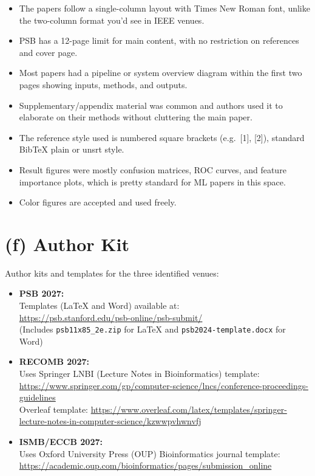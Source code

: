 \documentclass[12pt,a4paper]{article}
\begin{document}
\begin{itemize}
    \item The papers follow a single-column layout with Times New Roman font, unlike the two-column format you'd see in IEEE venues.
    \item PSB has a 12-page limit for main content, with no restriction on references and cover page.
    \item Most papers had a pipeline or system overview diagram within the first two pages showing inputs, methods, and outputs.
    \item Supplementary/appendix material was common and authors used it to elaborate on their methods without cluttering the main paper.
    \item The reference style used is numbered square brackets (e.g.\ [1], [2]), standard BibTeX plain or unsrt style.
    \item Result figures were mostly confusion matrices, ROC curves, and feature importance plots, which is pretty standard for ML papers in this space.
    \item Color figures are accepted and used freely.
\end{itemize}

\newpage

\section*{(f) Author Kit}

Author kits and templates for the three identified venues:

\begin{itemize}

    \item \textbf{PSB 2027:}\\
    Templates (LaTeX and Word) available at:\\
    \url{https://psb.stanford.edu/psb-online/psb-submit/}\\
    (Includes \texttt{psb11x85\_2e.zip} for LaTeX and \texttt{psb2024-template.docx} for Word)

    \vspace{0.5em}
    \item \textbf{RECOMB 2027:}\\
    Uses Springer LNBI (Lecture Notes in Bioinformatics) template:\\
    \url{https://www.springer.com/gp/computer-science/lncs/conference-proceedings-guidelines}\\
    Overleaf template: \url{https://www.overleaf.com/latex/templates/springer-lecture-notes-in-computer-science/kzwwpvhwnvfj}

    \vspace{0.5em}
    \item \textbf{ISMB/ECCB 2027:}\\
    Uses Oxford University Press (OUP) Bioinformatics journal template:\\
    \url{https://academic.oup.com/bioinformatics/pages/submission_online}

\end{itemize}
\end{document}
